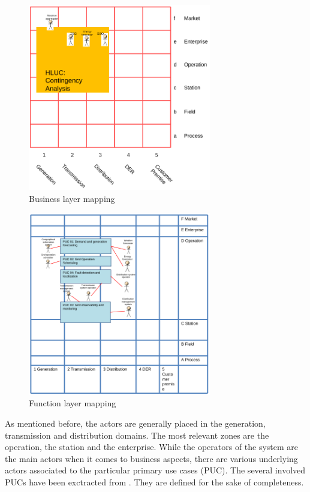 \begin{figure}[!htb]\centering
  \includegraphics[width=8.0cm]{Data/business.png}
\caption{Business layer mapping}
\label{fig:busins}
\end{figure}


\begin{figure}[!htb]\centering
  \includegraphics[width=8.0cm]{Data/function.png}
\caption{Function layer mapping}
\label{fig:functs}
\end{figure}

As mentioned before, the actors are generally placed in the generation, transmission and distribution domains. The most relevant zones are the operation, the station and the enterprise. While the operators of the system are the main actors when it comes to business aspects, there are various underlying actors associated to the particular primary use cases (PUC). The several involved PUCs have been exctracted from \cite{melendez2019resolvd}. They are defined for the sake of completeness. 


